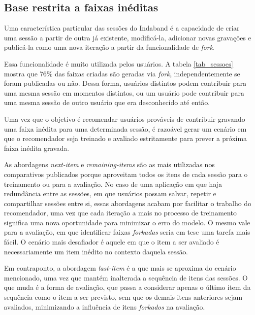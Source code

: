 \subsection{Base restrita a faixas inéditas} 

Uma característica particular das sessões do Indaband é a capacidade de criar
uma sessão a partir de outra já existente, modificá-la, adicionar novas
gravações e publicá-la como uma nova iteração a partir da funcionalidade de
\textit{fork}.

Essa funcionalidade é muito utilizada pelos usuários. A tabela \ref{tab_sessoes}
mostra que 76\% das faixas criadas são geradas via \textit{fork},
independentemente se foram publicadas ou não. Dessa forma, usuários distintos
podem contribuir para uma mesma sessão em momentos distintos, ou um usuário pode
contribuir para uma mesma sessão de outro usuário que era desconhecido até
então.

Uma vez que o objetivo é recomendar usuários prováveis de contribuir gravando
uma faixa inédita para uma determinada sessão, é razoável gerar um cenário em
que o recomendador seja treinado e avaliado estritamente para prever a próxima
faixa inédita gravada.

As abordagens \textit{next-item} e \textit{remaining-items} são as mais
utilizadas nos comparativos publicados porque aproveitam todos os itens de cada
sessão para o treinamento ou para a avaliação. No caso de uma aplicação em que
haja redundância entre as sessões, em que usuários possam salvar, repetir e
compartilhar sessões entre si, essas abordagens acabam por facilitar o trabalho
do recomendador, uma vez que cada iteração a mais no processo de treinamento
significa uma nova oportunidade para minimizar o erro do modelo. O mesmo vale
para a avaliação, em que identificar faixas \textit{forkadas} seria em tese uma
tarefa mais fácil. O cenário mais desafiador é aquele em que o item a ser
avaliado é necessariamente um item inédito no contexto daquela sessão.

Em contraponto, a abordagem \textit{last-item} é a que mais se aproxima do
cenário mencionado, uma vez que mantém inalterada a sequência de itens das
sessões. O que muda é a forma de avaliação, que passa a considerar apenas o
último item da sequência como o item a ser previsto, sem que os demais itens
anteriores sejam avaliados, minimizando a influência de itens \textit{forkados}
na avaliação.

